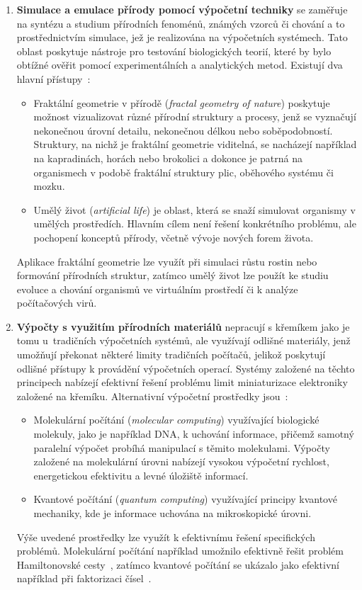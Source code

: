 \begin{enumerate}
    \item \textbf{Simulace a emulace přírody pomocí výpočetní techniky}
        se zaměřuje na syntézu a studium přírodních fenoménů, známých vzorců či chování a to prostřednictvím simulace, jež je realizována na výpočetních systémech. 
        Tato oblast poskytuje nástroje pro testování biologických teorií, které by bylo obtížné ověřit pomocí experimentálních a analytických metod. 
        Existují dva hlavní přístupy~\cite{FundamentalNatural}:
        \begin{itemize}
            \item Fraktální geometrie v přírodě (\emph{fractal geometry of nature}) poskytuje možnost vizualizovat různé přírodní struktury a procesy, jenž se vyznačují nekonečnou úrovní detailu, nekonečnou délkou nebo soběpodobností. 
                Struktury, na nichž je fraktální geometrie viditelná, se nacházejí například na kapradinách, horách nebo brokolici a dokonce je patrná na organismech v podobě fraktální struktury plic, oběhového systému či mozku. 
            \item Umělý život (\emph{artificial life}) je oblast, která se snaží simulovat organismy v umělých prostředích. 
                Hlavním cílem není řešení konkrétního problému, ale pochopení konceptů přírody, včetně vývoje nových forem života. 
        \end{itemize}
        Aplikace fraktální geometrie lze využít při simulaci růstu rostin nebo formování přírodních struktur, zatímco umělý život lze použít ke studiu evoluce a chování organismů ve virtuálním prostředí či k analýze počítačových virů. 
    \item \textbf{Výpočty s využitím přírodních materiálů} 
        nepracují s křemíkem jako je tomu u~tradičních výpočetních systémů, ale využívají odlišné materiály, jenž umožňují překonat některé limity tradičních počítačů, jelikož poskytují odlišné přístupy k provádění výpočetních operací. 
        Systémy založené na těchto principech nabízejí efektivní řešení problému limit miniaturizace elektroniky založené na křemíku. 
        Alternativní výpočetní prostředky jsou~\cite{FundamentalNatural}:
        \begin{itemize}
            \item Molekulární počítání (\emph{molecular computing}) využívající biologické molekuly, jako je například DNA, k uchování informace, přičemž samotný paralelní výpočet probíhá manipulací s těmito molekulami. 
                Výpočty založené na molekulární úrovni nabízejí vysokou výpočetní rychlost, energetickou efektivitu a levné úložiště informací. 
            \item Kvantové počítání (\emph{quantum computing}) využívající principy kvantové mechaniky, kde je informace uchována na mikroskopické úrovni. 
        \end{itemize}
        Výše uvedené prostředky lze využít k efektivnímu řešení specifických problémů. 
        Molekulární počítání například umožnilo efektivně řešit problém Hamiltonovské cesty~\cite{molecular}, zatímco kvantové počítání se ukázalo jako efektivní například při faktorizaci čísel~\cite{shor}. 
\end{enumerate}
